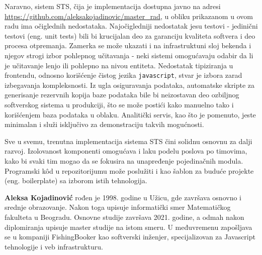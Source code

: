 \documentclass[12pt,oneside]{memoir}
\begin{document}
Naravno, sistem STS, čija je implementacija dostupna javno na adresi \\\href{https://github.com/aleksakojadinovic/master_rad}{https://github.com/aleksakojadinovic/master\_rad}, u obliku prikazanom u ovom radu ima očiglednih nedostataka. Najočigledniji nedostatak jesu testovi - jedinični testovi (eng. unit tests) bili bi krucijalan deo za garanciju kvaliteta softvera i deo procesa otpremanja. Zamerka se može ukazati i na infrastruktuni sloj bekenda i njegov strogi izbor pohlepnog učitavanja - neki sistemi omogućavaju odabir da li je učitavanje lenjo ili pohlepno na nivou entiteta. Nedostatak tipiziranja u frontendu, odnosno korišćenje čistog jezika \verb|javascript|, stvar je izbora zarad izbegavanja kompleksnosti. Iz ugla osiguravanja podataka, automatske skripte za generisanje rezervnih kopija baze podataka bile bi neizostavan deo ozbiljnog softverskog sistema u produkciji, što se može postići kako manuelno tako i korišćenjem baza podataka u oblaku. Analitički servis, kao što je pomenuto, jeste minimalan i služi isključivo za demonstraciju takvih mogućnosti.

Sve u svemu, trenutna implementacija sistema STS čini solidnu osnovnu za dalji razvoj. Izolovanost komponenti omogućava i laku podelu poslova po timovima, kako bi svaki tim mogao da se fokusira na unapređenje pojedinačnih modula. Programski k\^{o}d u repozitorijumu može poslužiti i kao šablon za buduće projekte (eng. boilerplate) sa izborom istih tehnologija.
\literatura

\backmatter

\begin{biografija}
\textbf{Aleksa Kojadinović} rođen je 1998. godine u Užicu, gde završava osnovno i srednje obrazovanje. Nakon toga upisuje informatički smer Matematičkog fakulteta u Beogradu. Osnovne studije završava 2021. godine, a odmah nakon diplomiranja upisuje master studije na istom smeru. U međuvremenu zapošljava se u kompaniji FishingBooker kao softverski inženjer, specijalizovan za Javascript tehnologije i veb infrastrukturu.
\end{biografija}
\end{document}
